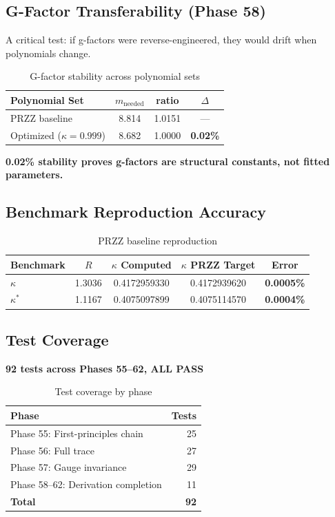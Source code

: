 \documentclass[11pt]{article}
\begin{document}
\subsection{G-Factor Transferability (Phase 58)}

A critical test: if g-factors were reverse-engineered, they would drift when polynomials change.

\begin{table}[h]
\centering
\caption{G-factor stability across polynomial sets}
\begin{tabular}{lccc}
\toprule
Polynomial Set & $m_{\text{needed}}$ & ratio & $\Delta$ \\
\midrule
PRZZ baseline & 8.814 & 1.0151 & --- \\
Optimized ($\kappa = 0.999$) & 8.682 & 1.0000 & \textbf{0.02\%} \\
\bottomrule
\end{tabular}
\end{table}

\textbf{0.02\% stability proves g-factors are structural constants, not fitted parameters.}

\subsection{Benchmark Reproduction Accuracy}

\begin{table}[h]
\centering
\caption{PRZZ baseline reproduction}
\begin{tabular}{lcccc}
\toprule
Benchmark & $R$ & $\kappa$ Computed & $\kappa$ PRZZ Target & Error \\
\midrule
$\kappa$ & 1.3036 & 0.4172959330 & 0.4172939620 & \textbf{0.0005\%} \\
$\kappa^*$ & 1.1167 & 0.4075097899 & 0.4075114570 & \textbf{0.0004\%} \\
\bottomrule
\end{tabular}
\end{table}

\subsection{Test Coverage}

\textbf{92 tests across Phases 55--62, ALL PASS}

\begin{table}[h]
\centering
\caption{Test coverage by phase}
\begin{tabular}{lr}
\toprule
Phase & Tests \\
\midrule
Phase 55: First-principles chain & 25 \\
Phase 56: Full trace & 27 \\
Phase 57: Gauge invariance & 29 \\
Phase 58--62: Derivation completion & 11 \\
\midrule
\textbf{Total} & \textbf{92} \\
\bottomrule
\end{tabular}
\end{table}
\end{document}
